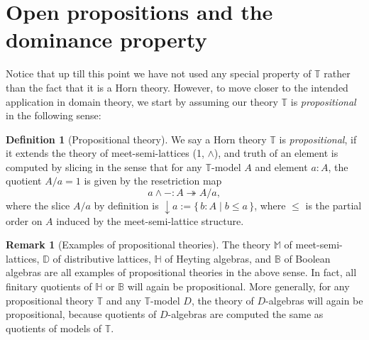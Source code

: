 \documentclass[12pt]{amsart}
\theoremstyle{definition}
\newtheorem{definition}[theorem]{Definition}
\newtheorem{remark}[theorem]{Remark}
\newcommand{\mbb}[1]{\mathbb{#1}}
\newcommand{\T}{\mbb T}
\newcommand{\I}{\mbb I}
\newcommand{\scomp}[2]{\{\,#1\mid#2\,\}}
\newcommand{\surj}{\twoheadrightarrow}
\newcommand{\cv}{\operatorname{\downarrow}}
\newcommand{\spec}{\operatorname{Spec}}
\begin{document}




\section{Open propositions and the dominance property}\label{sec:dominance}

Notice that up till this point we have not used any special property of $\T$ rather than the fact that it is a Horn theory. However, to move closer to the intended application in domain theory, we start by assuming our theory $\T$ is \emph{propositional} in the following sense: 

\begin{definition}[Propositional theory]\label{defn:propositional}
  We say a Horn theory $\T$ is \emph{propositional}, if it extends the theory of meet-semi-lattices (1, $\wedge$), and truth of an element is computed by slicing in the sense that for any $\T$-model $A$ and element $a:A$, the quotient $A/a=1$ is given by the resetriction map
  \[ a \wedge - : A \surj A/a, \]
  where the slice $A/a$ by definition is ${\cv} a := \scomp{b:A}{b\le a}$, where $\le$ is the partial order on $A$ induced by the meet-semi-lattice structure.
\end{definition}


\begin{remark}[Examples of propositional theories]
  The theory $\mbb M$ of meet-semi-lattices, $\mbb D$ of distributive lattices, $\mbb H$ of Heyting algebras, and $\mbb B$ of Boolean algebras are all examples of propositional theories in the above sense. In fact, all finitary quotients of $\mbb H$ or $\mbb B$ will again be propositional. More generally, for any propositional theory $\T$ and any $\T$-model $D$, the theory of $D$-algebras will again be propositional, because quotients of $D$-algebras are computed the same as quotients of models of $\T$.
\end{remark}
\end{document}
